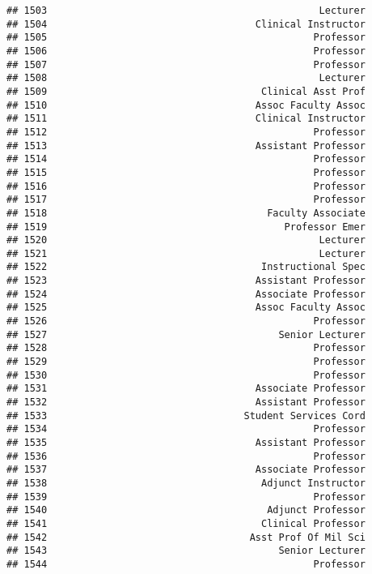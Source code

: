 \documentclass[
]{article}
\begin{document}
\begin{verbatim}
## 1503                                               Lecturer
## 1504                                    Clinical Instructor
## 1505                                              Professor
## 1506                                              Professor
## 1507                                              Professor
## 1508                                               Lecturer
## 1509                                     Clinical Asst Prof
## 1510                                    Assoc Faculty Assoc
## 1511                                    Clinical Instructor
## 1512                                              Professor
## 1513                                    Assistant Professor
## 1514                                              Professor
## 1515                                              Professor
## 1516                                              Professor
## 1517                                              Professor
## 1518                                      Faculty Associate
## 1519                                         Professor Emer
## 1520                                               Lecturer
## 1521                                               Lecturer
## 1522                                     Instructional Spec
## 1523                                    Assistant Professor
## 1524                                    Associate Professor
## 1525                                    Assoc Faculty Assoc
## 1526                                              Professor
## 1527                                        Senior Lecturer
## 1528                                              Professor
## 1529                                              Professor
## 1530                                              Professor
## 1531                                    Associate Professor
## 1532                                    Assistant Professor
## 1533                                  Student Services Cord
## 1534                                              Professor
## 1535                                    Assistant Professor
## 1536                                              Professor
## 1537                                    Associate Professor
## 1538                                     Adjunct Instructor
## 1539                                              Professor
## 1540                                      Adjunct Professor
## 1541                                     Clinical Professor
## 1542                                   Asst Prof Of Mil Sci
## 1543                                        Senior Lecturer
## 1544                                              Professor

\end{verbatim}
\end{document}
